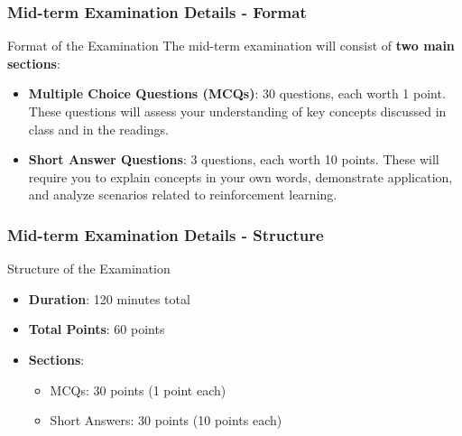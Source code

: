 \documentclass{beamer}
\begin{document}
\begin{frame}[fragile]
    \frametitle{Mid-term Examination Details - Format}
    \begin{block}{Format of the Examination}
        The mid-term examination will consist of \textbf{two main sections}:
        \begin{itemize}
            \item \textbf{Multiple Choice Questions (MCQs)}: 30 questions, each worth 1 point. These questions will assess your understanding of key concepts discussed in class and in the readings.
            \item \textbf{Short Answer Questions}: 3 questions, each worth 10 points. These will require you to explain concepts in your own words, demonstrate application, and analyze scenarios related to reinforcement learning.
        \end{itemize}
    \end{block}
\end{frame}

\begin{frame}[fragile]
    \frametitle{Mid-term Examination Details - Structure}
    \begin{block}{Structure of the Examination}
        \begin{itemize}
            \item \textbf{Duration}: 120 minutes total
            \item \textbf{Total Points}: 60 points
            \item \textbf{Sections}:
            \begin{itemize}
                \item MCQs: 30 points (1 point each)
                \item Short Answers: 30 points (10 points each)
            \end{itemize}
        \end{itemize}
    \end{block}
\end{frame}
\end{document}
